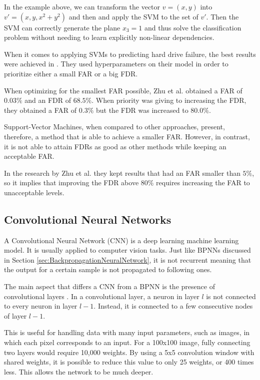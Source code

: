 In the example above, we can transform the vector $v = (x, y)$ into $v' = (x, y, x^2 + y^2)$ and then and apply the SVM to the set of $v'$.
Then the SVM can correctly generate the plane $x_3 = 1$ and thus solve the classification problem without needing to learn explicitly non-linear dependencies.

When it comes to applying SVMs to predicting hard drive failure, the best results were achieved in \cite{Zhu13}.
They used hyperparameters on their model in order to prioritize either a small FAR or a big FDR.

When optimizing for the smallest FAR possible, Zhu et al. obtained a FAR of $0.03\%$ and an FDR of $68.5\%$.
When priority was giving to increasing the FDR, they obtained a FAR of $0.3\%$ but the FDR was increased to $80.0\%$.

Support-Vector Machines, when compared to other approaches, present, therefore, a method that is able to achieve a smaller FAR.
However, in contrast, it is not able to attain FDRs as good as other methods while keeping an acceptable FAR.

In the research by Zhu et al. they kept results that had an FAR smaller than $5\%$, so it implies that improving the FDR above $80\%$ requires increasing the FAR to unacceptable levels.

\subsection{Convolutional Neural Networks}

A Convolutional Neural Network (CNN) is a deep learning machine learning model.
It is usually applied to computer vision tasks.
Just like BPNNs discussed in Section \ref{sec:BackpropagationNeuralNetwork}, it is not recurrent meaning that the output for a certain sample is not propagated to following ones.

The main aspect that differs a CNN from a BPNN is the presence of convolutional layers \cite{o2015introduction}.
In a convolutional layer, a neuron in layer $l$ is not connected to every neuron in layer $l-1$.
Instead, it is connected to a few consecutive nodes of layer $l-1$.

This is useful for handling data with many input parameters, such as images, in which each pixel corresponds to an input.
For a 100x100 image, fully connecting two layers would require 10,000 weights.
By using a 5x5 convolution window with shared weights, it is possible to reduce this value to only 25 weights, or 400 times less.
This allows the network to be much deeper.
 

